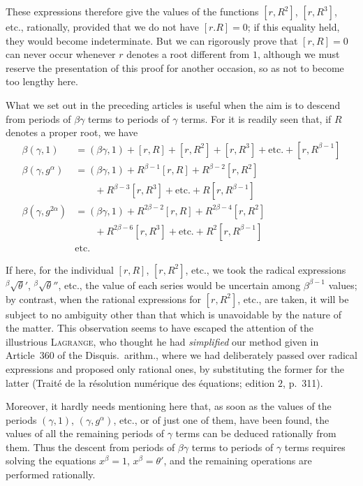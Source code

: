 These expressions therefore give the values of the functions $[r,R^2]$, $[r,R^3]$, etc., rationally, provided that we do not have $[r.R]=0$; if this equality held, they would become indeterminate. But we can rigorously prove that $[r,R]=0$ can never occur whenever $r$ denotes a root different from $1$, although we must reserve the presentation of this proof for another occasion, so as not to become too lengthy here.

What we set out in the preceding articles is useful when the aim is to descend from periods of $\beta\gamma$ terms to periods of $\gamma$ terms. For it is readily seen that, if $R$ denotes a proper root, we have
\[
\begin{aligned}
\beta(\gamma,1)&=(\beta\gamma,1)+[r,R]+[r,R^2]+[r,R^3]+\text{etc.}+[r,R^{\beta-1}]\\
\beta(\gamma,g^\alpha)&=(\beta\gamma,1)+R^{\beta-1}[r,R]+R^{\beta-2}[r,R^2]\\
&\qquad{}+R^{\beta-3}[r,R^3]+\text{etc.}+R[r,R^{\beta-1}]\\
\beta(\gamma,g^{2\alpha})&=(\beta\gamma,1)+R^{2\beta-2}[r,R]+R^{2\beta-4}[r,R^2]\\
&\qquad{}+R^{2\beta-6}[r,R^3]+\text{etc.}+R^2[r,R^{\beta-1}]\\
&\text{etc.}
\end{aligned}
\]

If here, for the individual $[r,R]$, $[r,R^2]$, etc., we took the radical expressions ${}^{\beta}\!\surd\theta'$, ${}^{\beta}\!\surd\theta''$, etc., the value of each series would be uncertain among $\beta^{\beta-1}$ values; by contrast, when the rational expressions for $[r,R^2]$, etc., are taken, it will be subject to no ambiguity other than that which is unavoidable by the nature of the matter. This observation seems to have escaped the attention of the illustrious \textsc{Lagrange}, who thought he had \emph{simplified} our method given in Article~360 of the Disquis.\ arithm., where we had deliberately passed over radical expressions and proposed only rational ones, by substituting the former for the latter (Traité de la résolution numérique des équations; edition $2$, p.\ 311).

Moreover, it hardly needs mentioning here that, as soon as the values of the periods $(\gamma,1)$, $(\gamma,g^\alpha)$, etc., or of just one of them, have been found, the values of all the remaining periods of $\gamma$ terms can be deduced rationally from them. Thus the descent from periods of $\beta\gamma$ terms to periods of $\gamma$ terms requires solving the equations $x^\beta=1$, $x^\beta=\theta'$, and the remaining operations are performed rationally.
